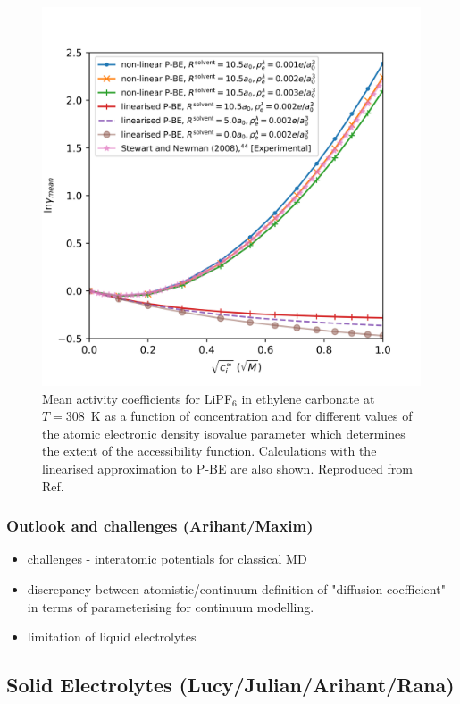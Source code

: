 \documentclass[../main.tex]{subfiles}
\begin{document}
\begin{figure}
    \includegraphics[scale=1]{figures/lipf6.png}
    \caption{Mean activity coefficients for LiPF$_6$ in ethylene carbonate at $T=308$~K as a function of concentration and for different values of the atomic electronic density isovalue parameter which determines the extent of the accessibility function. Calculations with the linearised approximation to P-BE are also shown. Reproduced from Ref. }
    \label{fig:ac}
\end{figure}
    
\subsubsection{Outlook and challenges (Arihant/Maxim)}
\begin{itemize}
    \item challenges - interatomic potentials for classical MD
    \item discrepancy between atomistic/continuum definition of "diffusion coefficient" in terms of parameterising for continuum modelling.
    \item limitation of liquid electrolytes
\end{itemize}

\subsection{Solid Electrolytes (Lucy/Julian/Arihant/Rana)}
\end{document}

